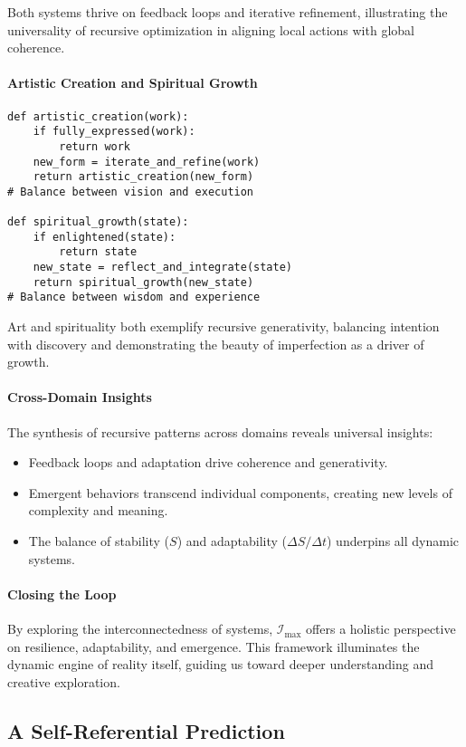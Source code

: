 \documentclass[12pt]{article}
\begin{document}
Both systems thrive on feedback loops and iterative refinement, illustrating the universality of recursive optimization in aligning local actions with global coherence.

\paragraph{Artistic Creation and Spiritual Growth}
\begin{verbatim}
def artistic_creation(work):
    if fully_expressed(work):
        return work
    new_form = iterate_and_refine(work)
    return artistic_creation(new_form)
# Balance between vision and execution

def spiritual_growth(state):
    if enlightened(state):
        return state
    new_state = reflect_and_integrate(state)
    return spiritual_growth(new_state)
# Balance between wisdom and experience
\end{verbatim}

Art and spirituality both exemplify recursive generativity, balancing intention with discovery and demonstrating the beauty of imperfection as a driver of growth.

\paragraph{Cross-Domain Insights}
The synthesis of recursive patterns across domains reveals universal insights:
\begin{itemize}
    \item Feedback loops and adaptation drive coherence and generativity.
    \item Emergent behaviors transcend individual components, creating new levels of complexity and meaning.
    \item The balance of stability (\( S \)) and adaptability (\( \Delta S / \Delta t \)) underpins all dynamic systems.
\end{itemize}

\paragraph{Closing the Loop}
By exploring the interconnectedness of systems, \(\mathcal{I}_{\text{max}}\) offers a holistic perspective on resilience, adaptability, and emergence. This framework illuminates the dynamic engine of reality itself, guiding us toward deeper understanding and creative exploration.

\subsection{A Self-Referential Prediction}
\end{document}
